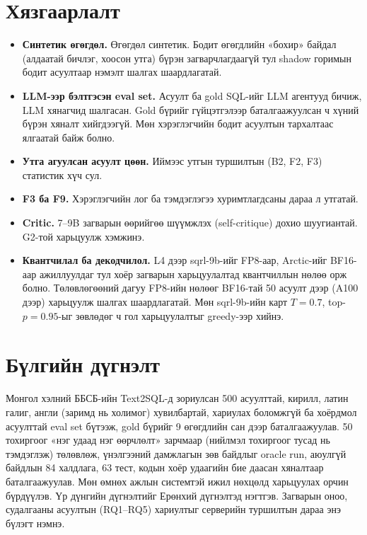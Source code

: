\section{Хязгаарлалт}
\label{sec:limits}

\begin{itemize}
  \item \textbf{Синтетик өгөгдөл.} Өгөгдөл синтетик. Бодит өгөгдлийн «бохир» байдал (алдаатай бичлэг, хоосон утга) бүрэн
        загварчлагдаагүй тул shadow горимын бодит асуултаар нэмэлт шалгах шаардлагатай.
  \item \textbf{LLM-ээр бэлтгэсэн eval set.} Асуулт ба gold SQL-ийг LLM агентууд бичиж, LLM хянагчид шалгасан. Gold бүрийг
        гүйцэтгэлээр баталгаажуулсан ч хүний бүрэн хяналт хийгдээгүй. Мөн хэрэглэгчийн бодит асуултын тархалтаас ялгаатай
        байж болно.
  \item \textbf{Утга агуулсан асуулт цөөн.} Иймээс утгын туршилтын (B2, F2, F3) статистик хүч сул.
  \item \textbf{F3 ба F9.} Хэрэглэгчийн лог ба тэмдэглэгээ хуримтлагдсаны дараа л утгатай.
  \item \textbf{Critic.} 7--9B загварын өөрийгөө шүүмжлэх (self-critique) дохио шуугиантай. G2-той харьцуулж хэмжинэ.
  \item \textbf{Квантчилал ба декодчилол.} L4 дээр sqrl-9b-ийг FP8-аар, Arctic-ийг BF16-аар ажиллуулдаг тул хоёр
        загварын харьцуулалтад квантчиллын нөлөө орж болно. Төлөвлөгөөний дагуу FP8-ийн нөлөөг BF16-тай 50 асуулт дээр
        (A100 дээр) харьцуулж шалгах шаардлагатай. Мөн sqrl-9b-ийн карт $T = 0.7$, top-$p = 0.95$-ыг зөвлөдөг ч гол
        харьцуулалтыг greedy-ээр хийнэ.
\end{itemize}

\section{Бүлгийн дүгнэлт}
\label{sec:ch3-summary}

Монгол хэлний ББСБ-ийн Text2SQL-д зориулсан 500 асуулттай, кирилл, латин галиг, англи (заримд нь холимог)
хувилбартай, хариулах боломжгүй ба хоёрдмол асуулттай eval set бүтээж, gold бүрийг 9 өгөгдлийн сан дээр баталгаажуулав.
50 тохиргоог «нэг удаад нэг өөрчлөлт» зарчмаар (нийлмэл тохиргоог тусад нь тэмдэглэж) төлөвлөж, үнэлгээний дамжлагын
зөв байдлыг oracle run, аюулгүй байдлын 84 халдлага, 63 тест, кодын
хоёр удаагийн бие даасан хяналтаар баталгаажуулав. Мөн өмнөх ажлын системтэй ижил нөхцөлд харьцуулах орчин бүрдүүлэв.
\ifnum{}
Үр дүнгийн дүгнэлтийг Ерөнхий дүгнэлтэд нэгтгэв.
\else
Загварын оноо, судалгааны асуултын (RQ1--RQ5) хариултыг серверийн туршилтын дараа энэ бүлэгт нэмнэ.
\fi
